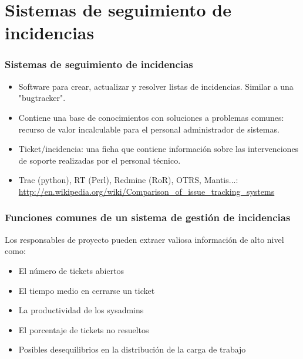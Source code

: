 \documentclass{beamer}
\begin{document}
\section{Sistemas de seguimiento de incidencias}


\begin{frame}
\frametitle{Sistemas de seguimiento de incidencias}

\begin{itemize}
\item Software para crear, actualizar y resolver listas de incidencias. Similar a una 
"bugtracker". 
\item Contiene una base de conocimientos con soluciones a problemas comunes: recurso de valor incalculable para el personal administrador de sistemas. 
\item \alert{Ticket/incidencia:} una ficha que contiene información sobre las intervenciones de soporte realizadas por el personal técnico. 
\item Trac (python), RT (Perl), Redmine (RoR), OTRS, Mantis...: \url{http://en.wikipedia.org/wiki/Comparison_of_issue_tracking_systems}
\end{itemize}
\end{frame}



\begin{frame}
\frametitle{Funciones comunes de un sistema de gestión de incidencias}

Los responsables de proyecto pueden extraer valiosa información de alto nivel como:

\begin{itemize}
\item El número de tickets abiertos 
\item El tiempo medio en cerrarse un ticket
\item La productividad de los sysadmins
\item El porcentaje de tickets no resueltos
\item Posibles desequilibrios en la distribución de la carga de trabajo

\end{itemize}
\end{frame}


\end{document}
